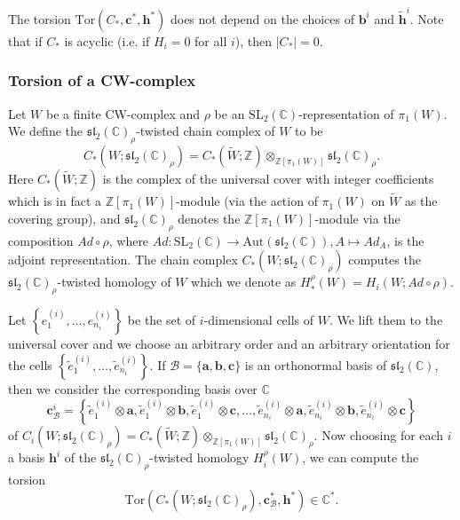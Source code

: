 \documentclass[a4paper]{amsart}
\theoremstyle{plain}
\theoremstyle{definition}
\theoremstyle{remark}
\newcommand{\ZZ}{{\mathbb Z}}
\newcommand{\C}{{\mathbb C}}
\newcommand{\CC}{{\mathbb C}}
\newcommand{\SL}{{\mathrm{SL}_2(\C)}}
\newcommand{\sll}{\mathfrak{sl}_2(\CC)}
\begin{document}
The torsion $\mathrm{Tor}(C_*, \mathbf{c}^*, \mathbf{h}^*)$ does not depend on the choices of $\mathbf{b}^i$ and $\widetilde{\mathbf{h}}^i$. 
Note that if $C_*$ is acyclic (i.e. if $H_i = 0$ for all $i$), then $|C_*| = 0$.




\subsubsection*{Torsion of a CW-complex}
Let $W$ be a finite CW-complex and $\rho$ be an $\SL$-re\-pre\-sen\-ta\-tion of $\pi_1(W)$. We define the $\sll_{\rho}$-twisted chain complex of $W$ to be
\[
C_*(W; \sll_\rho) = C_*(\widetilde{W}; \ZZ) \otimes_{\ZZ[\pi_1(W)]} \sll_\rho.
\]
Here $C_*(\widetilde{W}; \ZZ)$ is the complex of the universal cover with integer coefficients which is in fact a $\ZZ[\pi_1(W)]$-module (via the action of $\pi_1(W)$ on $\widetilde{W}$ as the covering group), and $\sll_\rho$ denotes the $\ZZ[\pi_1(W)]$-module via the composition $Ad \circ \rho$, where $Ad \colon \SL \to \mathrm{Aut}(\sll), A \mapsto Ad_A$, is the adjoint representation. The chain complex $C_*(W; \sll_\rho)$ computes the {$\sll_\rho$-twisted homology} of $W$ which we denote as $H_*^\rho(W) = H_i(W; Ad \circ \rho)$.

Let $\left\{e^{(i)}_1, \ldots, e^{(i)}_{n_i}\right\}$ be the set of $i$-dimensional cells of $W$. We lift them to the universal cover and we choose an arbitrary order and an arbitrary orientation for the cells $\left\{ {\tilde{e}^{(i)}_1, \ldots, \tilde{e}^{(i)}_{n_i}} \right\}$. If $\mathcal{B} = \{\mathbf{a}, \mathbf{b}, \mathbf{c}\}$ is an orthonormal basis of $\sll$, then we consider the corresponding  basis over $\CC$
$$\mathbf{c}^{i}_{\mathcal{B}} = \left\{ \tilde{e}^{(i)}_{1} \otimes \mathbf{a}, \tilde{e}^{(i)}_{1} \otimes \mathbf{b}, \tilde{e}^{(i)}_{1} \otimes \mathbf{c}, \ldots, \tilde{e}^{(i)}_{n_i}\otimes \mathbf{a}, \tilde{e}^{(i)}_{n_i} \otimes \mathbf{b}, \tilde{e}^{(i)}_{n_i}\otimes \mathbf{c}\right\}$$ of $C_i(W; \sll_\rho) = C_*(\widetilde{W}; \ZZ) \otimes_{\ZZ[\pi_1(W)]} \sll_\rho$. Now choosing for each $i$ a basis $\mathbf{h}^{i}$ of the $\sll_\rho$-twisted homology $H_i^\rho(W)$, we can compute the torsion
$$\mathrm{Tor}(C_*(W; \sll_\rho), \mathbf{c}^*_{\mathcal{B}}, \mathbf{h}^{*}) \in \CC^*.$$
\end{document}
